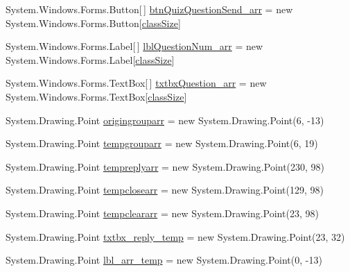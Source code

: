 \begin{DoxyCompactItemize}
\item 
\-System.\-Windows.\-Forms.\-Button\mbox{[}$\,$\mbox{]} \hyperlink{class_sr_p___classroom_inq_1_1frm_classrrom_inq_a007012d0330b5c8ad6b29271ddefe7f9}{btn\-Quiz\-Question\-Send\-\_\-arr} = new \-System.\-Windows.\-Forms.\-Button\mbox{[}\hyperlink{class_sr_p___classroom_inq_1_1frm_classrrom_inq_a78d9aab335edfe53d39036b9d89928a8}{class\-Size}\mbox{]}
\item 
\-System.\-Windows.\-Forms.\-Label\mbox{[}$\,$\mbox{]} \hyperlink{class_sr_p___classroom_inq_1_1frm_classrrom_inq_ae46e928c386c686caa96bfe4f302c2f1}{lbl\-Question\-Num\-\_\-arr} = new \-System.\-Windows.\-Forms.\-Label\mbox{[}\hyperlink{class_sr_p___classroom_inq_1_1frm_classrrom_inq_a78d9aab335edfe53d39036b9d89928a8}{class\-Size}\mbox{]}
\item 
\-System.\-Windows.\-Forms.\-Text\-Box\mbox{[}$\,$\mbox{]} \hyperlink{class_sr_p___classroom_inq_1_1frm_classrrom_inq_ac8b5f7f10341c6c43066881afcbbcaaa}{txtbx\-Question\-\_\-arr} = new \-System.\-Windows.\-Forms.\-Text\-Box\mbox{[}\hyperlink{class_sr_p___classroom_inq_1_1frm_classrrom_inq_a78d9aab335edfe53d39036b9d89928a8}{class\-Size}\mbox{]}
\item 
\-System.\-Drawing.\-Point \hyperlink{class_sr_p___classroom_inq_1_1frm_classrrom_inq_ace01ba3289e75624d67b90f742c195f5}{origingrouparr} = new \-System.\-Drawing.\-Point(6, -\/13)
\item 
\-System.\-Drawing.\-Point \hyperlink{class_sr_p___classroom_inq_1_1frm_classrrom_inq_a6c8231644b9d1f92d08f110b003d621e}{tempgrouparr} = new \-System.\-Drawing.\-Point(6, 19)
\item 
\-System.\-Drawing.\-Point \hyperlink{class_sr_p___classroom_inq_1_1frm_classrrom_inq_ac6007ba00a6fab2fca4b74c0e588e850}{tempreplyarr} = new \-System.\-Drawing.\-Point(230, 98)
\item 
\-System.\-Drawing.\-Point \hyperlink{class_sr_p___classroom_inq_1_1frm_classrrom_inq_a6ad2bdb537cfc35b174dd16dd8e03904}{tempclosearr} = new \-System.\-Drawing.\-Point(129, 98)
\item 
\-System.\-Drawing.\-Point \hyperlink{class_sr_p___classroom_inq_1_1frm_classrrom_inq_a189c01a3745fca62a8250be6a3517894}{tempcleararr} = new \-System.\-Drawing.\-Point(23, 98)
\item 
\-System.\-Drawing.\-Point \hyperlink{class_sr_p___classroom_inq_1_1frm_classrrom_inq_a0b175596cb83997b38795ee916c978f1}{txtbx\-\_\-reply\-\_\-temp} = new \-System.\-Drawing.\-Point(23, 32)
\item 
\-System.\-Drawing.\-Point \hyperlink{class_sr_p___classroom_inq_1_1frm_classrrom_inq_ae3405b23105270490b9685ac52e1b574}{lbl\-\_\-arr\-\_\-temp} = new \-System.\-Drawing.\-Point(0, -\/13)

\end{DoxyCompactItemize}
